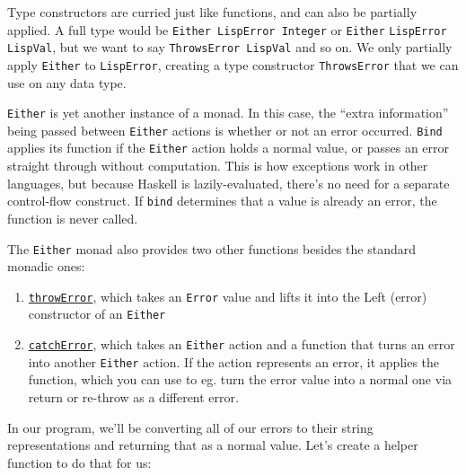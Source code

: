  
Type constructors are curried just like functions, and can also be partially applied. A full type would be \verb|Either LispError Integer| or \verb|Either| \verb|LispError| \verb|LispVal|, but we want to say \verb|ThrowsError LispVal| and so on. We only partially apply \verb|Either| to \verb|LispError|, creating a type constructor \verb|ThrowsError| that we can use on any data type.
 
\verb|Either| is yet another instance of a monad. In this case, the ``extra information'' being passed between \verb|Either| actions is whether or not an error occurred. \verb|Bind| applies its function if the \verb|Either| action holds a normal value, or passes an error straight through without computation. This is how exceptions work in other languages, but because Haskell is lazily-evaluated, there's no need for a separate control-flow construct. If \verb|bind| determines that a value is already an error, the function is never called.
 
The \verb|Either| monad also provides two other functions besides the standard monadic ones:
 
\begin{enumerate}
	\item \href{http://www.haskell.org/ghc/docs/6.4/html/libraries/mtl/Control.Monad.Error.html\#v\%3athrowError}{\texttt{throwError}}, which takes an \verb|Error| value and lifts it into the Left (error) constructor of an \verb|Either|
	\item \href{http://www.haskell.org/ghc/docs/6.4/html/libraries/mtl/Control.Monad.Error.html\#v\%3acatchError}{\texttt{catchError}}, which takes an \verb|Either| action and a function that turns an error into another \verb|Either| action. If the action represents an error, it applies the function, which you can use to eg. turn the error value into a normal one via return or re-throw as a different error.
\end{enumerate}
 
In our program, we'll be converting all of our errors to their string representations and returning that as a normal value. Let's create a helper function to do that for us:
 
